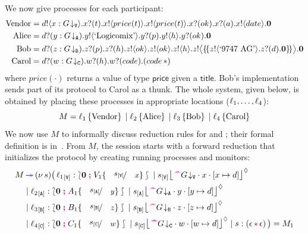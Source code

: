 \documentclass[runningheads,plain]{llncs}
\begin{document}
We now give processes for each participant:
\begin{align*}
\text{Vendor} & =  d ! \langle x:G\!\downarrow_{\mathtt{V}} \rangle .x ? (t) .x ! \langle price(t) \rangle .x ! \langle price(t) \rangle . x ? (ok) .x ? (a) . x ! \langle date \rangle .\mathbf{0}  
\\
\text{Alice} & =  d ? (y:G\!\downarrow_{\mathtt{A}}) .y ! \langle \text{`Logicomix'} \rangle .y ? (p) .y ! \langle h \rangle .y ? (ok) .\mathbf{0}  
\\
\text{Bob} & =  d ? (z:G\!\downarrow_{\mathtt{B}}) .z ? (p) .z ? (h) .z ! \langle ok \rangle .z ! \langle ok \rangle .z ! \langle h \rangle .
 z ! \big\langle \{\!\{z ! \langle \text{`9747 AG'} \rangle .z ? (d) .\mathbf{0}\}\!\} \big\rangle .\mathbf{0}
  \\
\text{Carol} & =  d ? (w:G\!\downarrow_{\mathtt{C}}) .w ? (h) .w ? (code) .(code\, {\ast})
\end{align*}
where $price(\cdot)$ returns a value of type $\mathsf{price}$ given a $\mathsf{title}$.
 Bob's implementation sends part of its protocol to Carol as a thunk.
The whole system, given below, is obtained by placing these processes   in appropriate locations ($\ell_1, \ldots, \ell_4$):
$$
M = \ell_1\left\{\text{Vendor}\right\} 
\;|\;
\ell_2\left\{\text{Alice}\right\} 
\;|\;
\ell_3\left\{\text{Bob}\right\} 
\;|\; 
\ell_4\left\{\text{Carol}\right\} 
$$
We now use $M$ to informally discuss reduction rules for \fw and \bk; {their formal definition is in~\cite{DBLP:conf/ppdp/MezzinaP17}}.
From $M$, the session starts with 
a forward reduction that
initializes the protocol by creating running processes and monitors:
\begin{align*}
M & \fw  \news{s}\big(\, 
\np{\key{{\loc_1}}{\pS}}{ \conf{\inact}{V_1\subst{\epS}{x}}} \Par 
\hmoni{\ep{s}{\pS}}{\past \tproj{G}{\pS}}{x}{\upd{x}{d}}  
\\
& \Par \np{\key{{\loc_2}}{\pA}}{ \conf{\inact}{A_1\subst{\epA}{y}}} \Par 
\hmoni{\ep{s}{\pA}}{\past \tproj{G}{\pA}}{y}{\upd{y}{d}} 
\\
& \Par \np{\key{{\loc_3}}{\pB}}{ \conf{\inact}{B_1\subst{\epB}{z}}} \Par 
\hmoni{\ep{s}{\pB}}{\past \tproj{G}{\pB}}{z}{\upd{z}{d}} 
\\
& \Par \np{\key{{\loc_4}}{\pC}}{ \conf{\inact}{C_1\subst{\epC}{w}}} \Par 
\hmoni{\ep{s}{\pC}}{\past \tproj{G}{\pC}}{w}{\upd{w}{d}}  
  \Par \codah{s}{\emp}{\emp}{}~\big)  = M_1
\end{align*}
\end{document}
